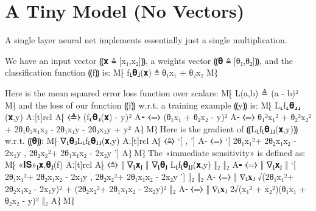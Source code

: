 \documentclass{article}
\begin{document}
\section{A Tiny Model (No Vectors)}

A single layer neural net implements essentially just a single multiplication.

We have an input vector ⸨𝐱 ≜ [x₁,x₂]⸩, a weights vector ⸨𝛉 ≜ [θ₁,θ₂]⸩, and the
classification function ⸨f⸩ is:
M⁅ f⸤𝛉⸥(𝐱) ≜ θ₁x₁ + θ₂x₂ M⁆

Here is the mean squared error loss function over scalars:
M⁅ L(a,b) ≜ (a - b)² M⁆
and the loss of our function ⸨f⸩ {w.r.t.} a training example ⸨y⸩ is:
M⁅ L⸤f⸤𝛉⸥⸥(𝐱,y) Aː[t]rcl
                A⁅ ⧼≜⧽ (f⸤𝛉⸥(𝐱) - y)² 
                A⁃ ⧼=⧽ (θ₁x₁ + θ₂x₂ - y)²
                A⁃ ⧼=⧽ θ₁²x₁² + θ₂²x₂² + 2θ₁θ₂x₁x₂ - 2θ₁x₁y - 2θ₂x₂y + y²
                A⁆
M⁆
Here is the gradient of ⸨L⸤f⸤𝛉⸥⸥(𝐱,y)⸩ {w.r.t.} ⸨𝛉⸩:
M⁅ ∇⸤𝛉⸥L⸤f⸤𝛉⸥⸥(𝐱,y) Aː[t]rcl
                    A⁅ ⧼≜⧽ ‘[  ,  ’]
                    A⁃ ⧼=⧽ ‘[ 2θ₁x₁²+ 2θ₂x₁x₂ - 2x₁y , 2θ₂x₂²+ 2θ₁x₁x₂ - 2x₂y ’]
                    A⁆
M⁆
The «immediate sensitivity» is defined as:
M⁅ «𝐈𝐒»⸤𝐱,𝛉⸥(f) Aː[t]rcl
                  A⁅ ⧼≜⧽ ‖ ∇⸤𝐱⸥ ‖ ∇⸤𝛉⸥ L⸤f⸤𝛉⸥⸥(𝐱,y) ‖₂ ‖₂
                  A⁃ ⧼=⧽ ‖ ∇⸤𝐱⸥ ‖ ‘[ 2θ₁x₁²+ 2θ₂x₁x₂ - 2x₁y , 2θ₂x₂²+ 2θ₁x₁x₂ - 2x₂y ’] ‖₂ ‖₂
                  A⁃ ⧼=⧽ ‖ ∇⸤𝐱⸥ √{(2θ₁x₁²+ 2θ₂x₁x₂ - 2x₁y)² + (2θ₂x₂²+ 2θ₁x₁x₂ - 2x₂y)²} ‖₂
                  A⁃ ⧼=⧽ ‖ ∇⸤𝐱⸥ 2√{(x₁² + x₂²)(θ₁x₁ + θ₂x₂ - y)²} ‖₂
                  A⁆
M⁆
\end{document}
